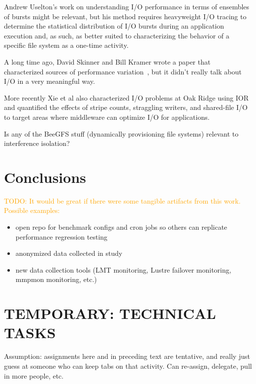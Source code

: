 \documentclass[conference,10pt,compsocconf]{IEEEtran}
\newcommand{\todo}[1]{\textcolor{Orange}{TODO: #1}}
\begin{document}
Andrew Uselton's work on understanding I/O performance in terms of ensembles of
bursts might be relevant\cite{Uselton2010}, but his method requires heavyweight
I/O tracing to determine the statistical distribution of I/O bursts during an
application execution and, as such, as better suited to characterizing the
behavior of a specific file system as a one-time activity.

A long time ago, David Skinner and Bill Kramer wrote a paper that characterized
sources of performance variation~\cite{Skinner2005}, but it didn't really talk
about I/O in a very meaningful way.

More recently Xie et al also characterized I/O problems at Oak
Ridge\cite{Xie2012} using IOR and quantified the effects of stripe counts,
straggling writers, and shared-file I/O to target areas where middleware can
optimize I/O for applications.

Is any of the BeeGFS stuff (dynamically provisioning file systems) relevant to
interference isolation?

\section{Conclusions} \label{sec:conclusions}

\todo{It would be great if there were some tangible artifacts from this work.
Possible examples:}
\begin{itemize}
\item open repo for benchmark configs and cron jobs so others can replicate
performance regression testing
\item anonymized data collected in study
\item new data collection tools (LMT monitoring, Lustre failover monitoring,
mmpmon monitoring, etc.)
\end{itemize}

\section{TEMPORARY: TECHNICAL TASKS}

Assumption: assignments here and in preceding text are tentative, and really
just guess at someone who can keep tabs on that activity.  Can re-assign,
delegate, pull in more people, etc.
\end{document}
